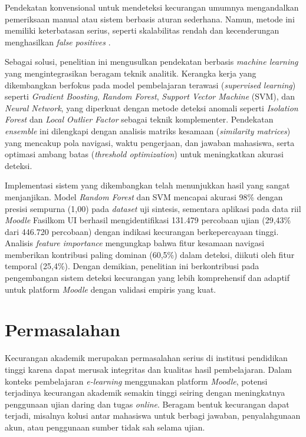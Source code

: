 Pendekatan konvensional untuk mendeteksi kecurangan umumnya mengandalkan pemeriksaan manual atau sistem berbasis aturan sederhana. Namun, metode ini memiliki keterbatasan serius, seperti skalabilitas rendah dan kecenderungan menghasilkan \textit{false positives} \cite{MorenoMarcos2023}. 

Sebagai solusi, penelitian ini mengusulkan pendekatan berbasis \textit{machine learning} yang mengintegrasikan beragam teknik analitik. Kerangka kerja yang dikembangkan berfokus pada model pembelajaran terawasi (\textit{supervised learning}) seperti \textit{Gradient Boosting}, \textit{Random Forest}, \textit{Support Vector Machine} (SVM), dan \textit{Neural Network}, yang diperkuat dengan metode deteksi anomali seperti \textit{Isolation Forest} dan \textit{Local Outlier Factor} sebagai teknik komplementer. Pendekatan \textit{ensemble} ini dilengkapi dengan analisis matriks kesamaan (\textit{similarity matrices}) yang mencakup pola navigasi, waktu pengerjaan, dan jawaban mahasiswa, serta optimasi ambang batas (\textit{threshold optimization}) untuk meningkatkan akurasi deteksi.

Implementasi sistem yang dikembangkan telah menunjukkan hasil yang sangat menjanjikan. Model \textit{Random Forest} dan SVM mencapai akurasi 98\% dengan presisi sempurna (1,00) pada \textit{dataset} uji sintesis, sementara aplikasi pada data riil \textit{Moodle} Fasilkom UI berhasil mengidentifikasi 131.479 percobaan ujian (29,43\% dari 446.720 percobaan) dengan indikasi kecurangan berkepercayaan tinggi. Analisis \textit{feature importance} mengungkap bahwa fitur kesamaan navigasi memberikan kontribusi paling dominan (60,5\%) dalam deteksi, diikuti oleh fitur temporal (25,4\%). Dengan demikian, penelitian ini berkontribusi pada pengembangan sistem deteksi kecurangan yang lebih komprehensif dan adaptif untuk platform \textit{Moodle} dengan validasi empiris yang kuat.

\section{Permasalahan}
\label{sec:masalah}

Kecurangan akademik merupakan permasalahan serius di institusi pendidikan tinggi karena dapat merusak integritas dan kualitas hasil pembelajaran. Dalam konteks pembelajaran \textit{e-learning} menggunakan platform \textit{Moodle}, potensi terjadinya kecurangan akademik semakin tinggi seiring dengan meningkatnya penggunaan ujian daring dan tugas \textit{online}. Beragam bentuk kecurangan dapat terjadi, misalnya kolusi antar mahasiswa untuk berbagi jawaban, penyalahgunaan akun, atau penggunaan sumber tidak sah selama ujian.

